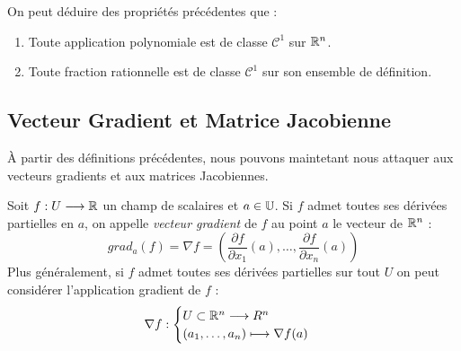 \begin{proposition}
    On peut déduire des propriétés précédentes que : 
    \begin{enumerate}
        \item Toute application polynomiale est de classe $ \mathcal{C^1}$ sur $\mathbb{R}^n$. 
        \item Toute fraction rationnelle est de classe $ \mathcal{C^1}$ sur son ensemble de définition. 
    \end{enumerate}
\end{proposition}

\subsection{Vecteur Gradient et Matrice Jacobienne}

À partir des définitions précédentes, nous pouvons maintetant nous attaquer aux vecteurs gradients et aux matrices 
Jacobiennes. 

\begin{definition}
    Soit $f : U \longrightarrow \mathbb{R}$ un champ de scalaires et $ a \in \mathbb{U}$. 
    Si $f$ admet toutes ses dérivées partielles en $a$, on appelle \emph{vecteur gradient} de $f$ au point $a$ 
    le vecteur de $\mathbb{R}^n$ :
        \[ \boxed{ grad_a(f) = \nabla f = \left(\frac{\partial f}{\partial x_1}(a), \dots, \frac{\partial f}{\partial x_n}(a)\right) } \] 
    Plus généralement, si $f$ admet toutes ses dérivées partielles sur tout $U$ on peut considérer l'application gradient 
    de $f$ : 
        \[ \nabla f : 
            \begin{cases}
                U \subset \mathbb{R}^n \longrightarrow R^n \\ 
                (a_1, \dots, a_n) \longmapsto \nabla f(a) 
            \end{cases} \] 
\end{definition}

